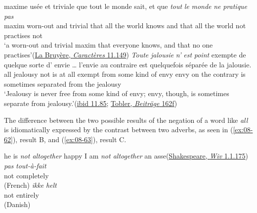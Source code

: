 \ea \label{ex:08-60}
\ea
\gll maxime usée et triviale que tout le monde sait, et que \emph{tout} \emph{le} \emph{monde} \emph{ne} \emph{pratique} \emph{pas}\\
 maxim worn-out and trivial that all the world knows and that all the world not practises not\\
\glt `a worn-out and trivial maxim that everyone knows, and that no one practises'\hfill(\href{https://archive.org/details/oeuvrescompltes01bruygoog/page/n137/mode/2up?q=%22maxime%22&view=theater}{La Bruyère, \textit{Caractères} 11.149}) %
\ex
\gll \emph{Toute} \emph{jalousie} \emph{n'} \emph{est} \emph{point} exempte de quelque sorte d' envie {\dots} l'envie au contraire est quelquefois séparée de la jalousie.\\
 all jealousy not is {at all} exempt from some kind of envy {} envy {on the} contrary is sometimes separated from the jealousy\\
\glt `Jealousy is never free from some kind of envy; envy, though, is sometimes separate from jealousy.'\hfill(\href{https://archive.org/details/oeuvrescompltes01bruygoog/page/n107/mode/2up?q=%22Toute+jalousie%22&view=theater}{ibid 11.85}; \href{https://archive.org/details/vermischtebeitr04toblgoog/page/n195/mode/2up?view=theater&q=%22toute+jalousie%22}{Tobler, \textit{Beiträge} 162f}) %
\z
\z

The difference between the two possible results of the negation of a word like \textit{all} is idiomatically expressed by the contrast between two adverbs, as seen in (\ref{ex:08-62}), result B, and (\ref{ex:08-63}), result C.

\ea \label{ex:08-62}
\ea
he is \emph{not altogether} happy 
\ex
I am \emph{not altogether} an asse\hfill(\href{https://internetshakespeare.uvic.ca/doc/Wiv_F1/index.html#tln-155}{Shakespeare, \textit{Wiv} 1.1.175}) %
\ex
\gll \emph{pas} \emph{tout-à-fait}\\ 
 not completely\\\hfill(French)
\ex{}
\gll \emph{ikke} \emph{helt}\\
 not entirely\\\hfill(Danish)

